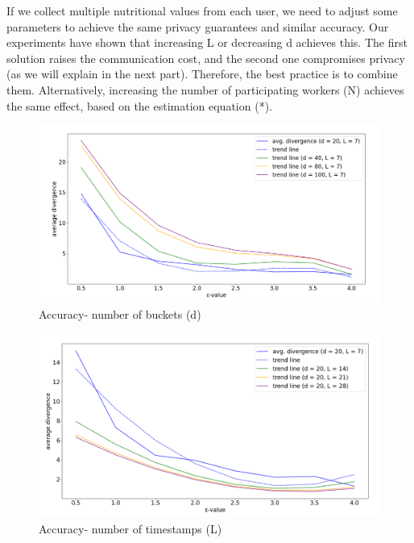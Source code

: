 \documentclass[sigconf]{acmart}
\begin{document}
If we collect multiple nutritional values from each user, we need to adjust some parameters to achieve the same privacy guarantees and similar accuracy. Our experiments have shown that increasing L or decreasing d achieves this. The first solution raises the communication cost, and the second one compromises privacy (as we will explain in the next part). Therefore, the best practice is to combine them. Alternatively, increasing the number of participating workers (N) achieves the same effect, based on the estimation equation (*).
\begin{figure}[h]
    \centering
    \includegraphics[width=.5\textwidth]{images/accuracy- d(3).png}
    \caption{Accuracy- number of buckets (d)}
    \label{fig:accuracy-d}
\end{figure}
\begin{figure}[h]
    \centering
    \includegraphics[width=.5\textwidth]{images/accuracy- L.png}
    \caption{Accuracy- number of timestamps (L)}
    \label{fig:accuracy-L}
\end{figure} 
\end{document}
